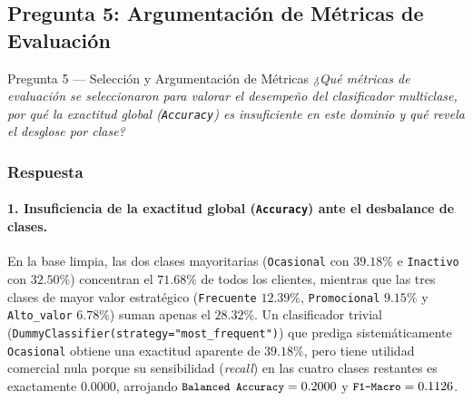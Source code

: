\documentclass[11pt,a4paper]{article}
\newcommand{\code}[1]{\texttt{\small #1}}
\begin{document}
\subsection{Pregunta 5: Argumentación de Métricas de Evaluación}

\begin{pregunta}{Pregunta 5 --- Selección y Argumentación de Métricas}{}
\textit{¿Qué métricas de evaluación se seleccionaron para valorar el desempeño del clasificador multiclase, por qué la exactitud global (\texttt{Accuracy}) es insuficiente en este dominio y qué revela el desglose por clase?}
\end{pregunta}

\subsubsection*{Respuesta}

\paragraph{1. Insuficiencia de la exactitud global (\code{Accuracy}) ante el desbalance de clases.}
En la base limpia, las dos clases mayoritarias (\code{Ocasional} con $39.18\%$ e \code{Inactivo} con $32.50\%$) concentran el $\mathbf{71.68\%}$ de todos los clientes, mientras que las tres clases de mayor valor estratégico (\code{Frecuente} $12.39\%$, \code{Promocional} $9.15\%$ y \code{Alto\_valor} $6.78\%$) suman apenas el $28.32\%$. Un clasificador trivial (\code{DummyClassifier(strategy="most\_frequent")}) que prediga sistemáticamente \code{Ocasional} obtiene una exactitud aparente de $\mathbf{39.18\%}$, pero tiene utilidad comercial nula porque su sensibilidad (\textit{recall}) en las cuatro clases restantes es exactamente $0.0000$, arrojando $\text{\code{Balanced Accuracy}} = 0.2000$ y $\text{\code{F1-Macro}} = 0.1126$.
\end{document}
